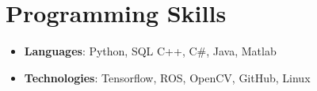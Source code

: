 \documentclass[letterpaper,11pt]{article}
\newcommand{\resumeSubHeadingListStart}{\begin{itemize}[leftmargin=*]}
\newcommand{\resumeSubHeadingListEnd}{\end{itemize}}
\begin{document}
\section{Programming Skills}
  \resumeSubHeadingListStart
    \item{
      \textbf{Languages}{: Python, SQL C++, C\#, Java, Matlab}
      \hfill
    }
    \item{
    	\textbf{Technologies}{: Tensorflow, ROS, OpenCV, GitHub, Linux }
    }
  \resumeSubHeadingListEnd


\end{document}

